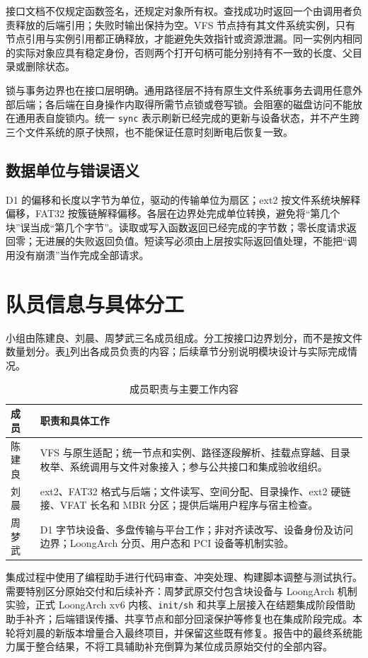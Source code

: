 \documentclass[conference]{IEEEtran}
\newcommand{\code}[1]{\texttt{#1}}
\begin{document}
接口文档不仅规定函数签名，还规定对象所有权。查找成功时返回一个由调用者负责释放的后端引用；失败时输出保持为空。VFS 节点持有其文件系统实例，只有节点引用与实例引用都正确释放，才能避免失效指针或资源泄漏。同一实例内相同的实际对象应具有稳定身份，否则两个打开句柄可能分别持有不一致的长度、父目录或删除状态。

锁与事务边界也在接口层明确。通用路径层不持有原生文件系统事务去调用任意外部后端；各后端在自身操作内取得所需节点锁或卷写锁。会阻塞的磁盘访问不能放在通用表自旋锁内。统一 \code{sync} 表示刷新已经完成的更新与设备状态，并不产生跨三个文件系统的原子快照，也不能保证任意时刻断电后恢复一致。

\subsection{数据单位与错误语义}
D1 的偏移和长度以字节为单位，驱动的传输单位为扇区；ext2 按文件系统块解释偏移，FAT32 按簇链解释偏移。各层在边界处完成单位转换，避免将“第几个块”误当成“第几个字节”。读取或写入函数返回已经完成的字节数；零长度请求返回零；无进展的失败返回负值。短读写必须由上层按实际返回值处理，不能把“调用没有崩溃”当作完成全部请求。

\section{队员信息与具体分工}
小组由陈建良、刘晨、周梦武三名成员组成。分工按接口边界划分，而不是按文件数量划分。表\ref{tab:roles}列出各成员负责的内容；后续章节分别说明模块设计与实际完成情况。

\begin{table}[t]
\caption{成员职责与主要工作内容}
\label{tab:roles}
\centering
\begin{tabular}{p{1.25cm}p{6.35cm}}
\toprule
成员 & 职责和具体工作 \\
\midrule
陈建良 & VFS 与原生适配；统一节点和实例、路径逐段解析、挂载点穿越、目录枚举、系统调用与文件对象接入；参与公共接口和集成验收组织。 \\
刘晨 & ext2、FAT32 格式与后端；文件读写、空间分配、目录操作、ext2 硬链接、VFAT 长名和 MBR 分区；提供后端用户程序与宿主检查。 \\
周梦武 & D1 字节块设备、多盘传输与平台工作；非对齐读改写、设备身份及访问边界；LoongArch 分页、用户态和 PCI 设备等机制实验。 \\
\bottomrule
\end{tabular}
\end{table}

集成过程中使用了编程助手进行代码审查、冲突处理、构建脚本调整与测试执行。需要特别区分原始交付和后续补齐：周梦武原交付包含块设备与 LoongArch 机制实验，正式 LoongArch xv6 内核、\code{init/sh} 和共享上层接入在结题集成阶段借助助手补齐；后端错误传播、共享节点和部分回滚保护等修复也在集成阶段完成。本轮将刘晨的新版本增量合入最终项目，并保留这些既有修复。报告中的最终系统能力属于整合结果，不将工具辅助补充倒算为某位成员原始交付的全部内容。
\end{document}
